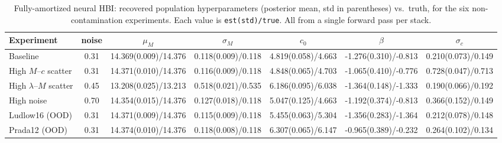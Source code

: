 \begin{table}
\centering
\caption{Fully-amortized neural HBI: recovered population hyperparameters (posterior mean, std in parentheses) vs.\ truth, for the six non-contamination experiments. Each value is \texttt{est(std)/true}. All from a single forward pass per stack. \label{tab:afull}}
\begin{tabular}{lcccccc}
\toprule
Experiment & noise & $\mu_M$ & $\sigma_M$ & $c_0$ & $\beta$ & $\sigma_c$ \\
\midrule
Baseline & 0.31 & 14.369(0.009)/14.376 & 0.118(0.009)/0.118 & 4.819(0.058)/4.663 & -1.276(0.310)/-0.813 & 0.210(0.073)/0.149 \\
High $M$--$c$ scatter & 0.31 & 14.371(0.010)/14.376 & 0.116(0.009)/0.118 & 4.848(0.065)/4.703 & -1.065(0.410)/-0.776 & 0.728(0.047)/0.713 \\
High $\lambda$--$M$ scatter & 0.45 & 13.208(0.025)/13.213 & 0.518(0.021)/0.535 & 6.186(0.095)/6.038 & -1.364(0.148)/-1.333 & 0.190(0.066)/0.192 \\
High noise & 0.70 & 14.354(0.015)/14.376 & 0.127(0.018)/0.118 & 5.047(0.125)/4.663 & -1.192(0.374)/-0.813 & 0.366(0.152)/0.149 \\
Ludlow16 (OOD) & 0.31 & 14.371(0.009)/14.376 & 0.115(0.009)/0.118 & 5.455(0.063)/5.304 & -1.356(0.283)/-1.364 & 0.212(0.078)/0.148 \\
Prada12 (OOD) & 0.31 & 14.374(0.010)/14.376 & 0.118(0.008)/0.118 & 6.307(0.065)/6.147 & -0.965(0.389)/-0.232 & 0.264(0.102)/0.134 \\
\bottomrule
\end{tabular}
\end{table}